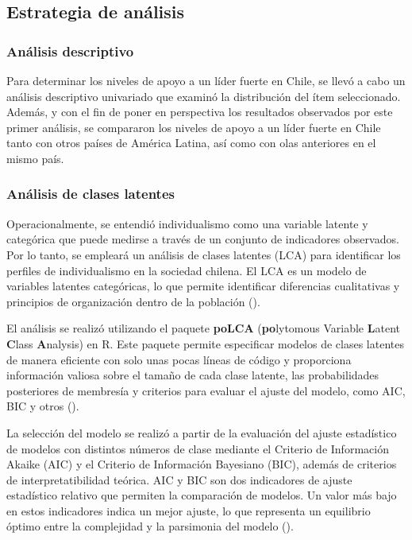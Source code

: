\documentclass[
  letterpaper,
  DIV=11,
  numbers=noendperiod]{scrartcl}
\begin{document}
\FloatBarrier

\subsection*{Estrategia de análisis}\label{estrategia-de-anuxe1lisis}

\subsubsection*{Análisis descriptivo}\label{anuxe1lisis-descriptivo}

Para determinar los niveles de apoyo a un líder fuerte en Chile, se
llevó a cabo un análisis descriptivo univariado que examinó la
distribución del ítem seleccionado. Además, y con el fin de poner en
perspectiva los resultados observados por este primer análisis, se
compararon los niveles de apoyo a un líder fuerte en Chile tanto con
otros países de América Latina, así como con olas anteriores en el mismo
país.

\subsubsection*{Análisis de clases
latentes}\label{anuxe1lisis-de-clases-latentes}

Operacionalmente, se entendió individualismo como una variable latente y
categórica que puede medirse a través de un conjunto de indicadores
observados. Por lo tanto, se empleará un análisis de clases latentes
(LCA) para identificar los perfiles de individualismo en la sociedad
chilena. El LCA es un modelo de variables latentes categóricas, lo que
permite identificar diferencias cualitativas y principios de
organización dentro de la población ().

El análisis se realizó utilizando el paquete \textbf{poLCA}
(\textbf{po}lytomous Variable \textbf{L}atent \textbf{C}lass
\textbf{A}nalysis) en R. Este paquete permite especificar modelos de
clases latentes de manera eficiente con solo unas pocas líneas de código
y proporciona información valiosa sobre el tamaño de cada clase latente,
las probabilidades posteriores de membresía y criterios para evaluar el
ajuste del modelo, como AIC, BIC y otros
().

La selección del modelo se realizó a partir de la evaluación del ajuste
estadístico de modelos con distintos números de clase mediante el
Criterio de Información Akaike (AIC) y el Criterio de Información
Bayesiano (BIC), además de criterios de interpretatibilidad teórica. AIC
y BIC son dos indicadores de ajuste estadístico relativo que permiten la
comparación de modelos. Un valor más bajo en estos indicadores indica un
mejor ajuste, lo que representa un equilibrio óptimo entre la
complejidad y la parsimonia del modelo
().
\end{document}
